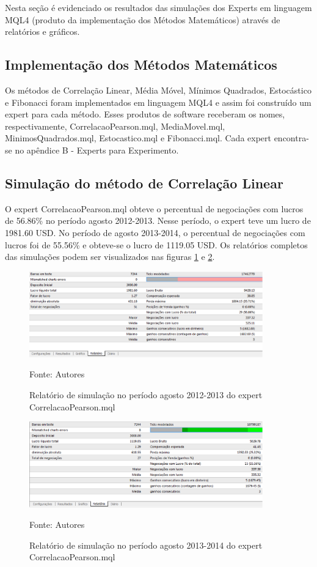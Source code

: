 Nesta seção é evidenciado os resultados  das simulações dos Experts em linguagem MQL4 (produto da implementação dos Métodos Matemáticos) através de relatórios e gráficos.

\subsection{Implementação dos Métodos Matemáticos}

Os métodos de Correlação Linear, Média Móvel, Mínimos Quadrados, Estocástico e Fibonacci foram implementados em linguagem MQL4 e assim foi construído um expert para cada método. Esses produtos de software receberam os nomes, respectivamente, CorrelacaoPearson.mql, MediaMovel.mql, MinimosQuadrados.mql, Estocastico.mql e Fibonacci.mql. Cada expert encontra-se no apêndice B - Experts para Experimento.

\subsection{Simulação do método de Correlação Linear}

O expert CorrelacaoPearson.mql obteve o percentual de negociações com lucros de 56.86\% no período agosto 2012-2013. Nesse período, o expert teve um lucro de 1981.60 USD.
 No período de agosto 2013-2014, o percentual de negociações com lucros foi de 55.56\%  e obteve-se o lucro de 1119.05 USD. 
Os relatórios completos das simulações podem ser visualizados nas figuras \ref{protocoloCorrelacao} e \ref{protocoloCorrelacao2}.

\begin{figure}[htp]
\centering
\includegraphics[width=0.9\textwidth]{figuras/protocoloCorrelacao}
\caption{Relatório de simulação no período agosto 2012-2013 do expert CorrelacaoPearson.mql}{Fonte: Autores} 
\label{protocoloCorrelacao}
\end{figure}

\begin{figure}[htp]
\centering

\includegraphics[width=0.9\textwidth]{figuras/protocoloCorrelacao2}
\caption{Relatório de simulação no período agosto 2013-2014 do expert CorrelacaoPearson.mql}{Fonte: Autores} 
\label{protocoloCorrelacao2}
\end{figure}

